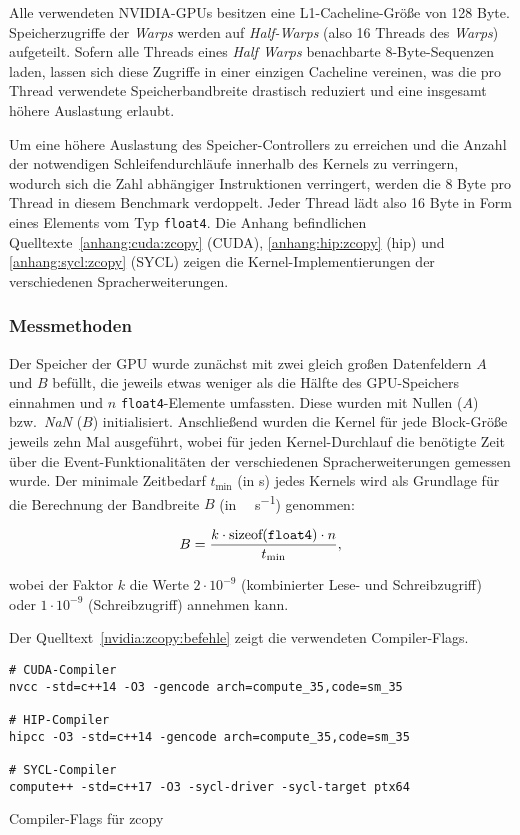 Alle verwendeten NVIDIA-GPUs besitzen eine L1-Cacheline-Größe von \num{128}
Byte. Speicherzugriffe der \textit{Warps} werden auf \textit{Half-Warps} (also
\num{16} Threads des \textit{Warps}) aufgeteilt. Sofern alle Threads eines
\textit{Half Warps} benachbarte \num{8}-Byte-Sequenzen laden, lassen sich diese
Zugriffe in einer einzigen Cacheline vereinen, was die pro Thread verwendete
Speicherbandbreite drastisch reduziert und eine insgesamt höhere Auslastung
erlaubt.

Um eine höhere Auslastung des Speicher-Controllers zu erreichen und die Anzahl
der notwendigen Schleifendurchläufe innerhalb des Kernels zu verringern, wodurch
sich die Zahl abhängiger Instruktionen verringert, werden die \num{8} Byte pro
Thread in diesem Benchmark verdoppelt. Jeder Thread lädt also \num{16} Byte in
Form eines Elements vom Typ \texttt{float4}. Die Anhang befindlichen
Quelltexte~\ref{anhang:cuda:zcopy} (CUDA), \ref{anhang:hip:zcopy} (\gls{hip})
und \ref{anhang:sycl:zcopy} (SYCL) zeigen die Kernel-Implementierungen der
verschiedenen Spracherweiterungen.

\subsubsection{Messmethoden}
\label{nvidia:zcopy:methoden}

Der Speicher der GPU wurde zunächst mit zwei gleich großen Datenfeldern $A$ und
$B$ befüllt, die jeweils etwas weniger als die Hälfte des GPU-Speichers
einnahmen und $n$ \texttt{float4}-Elemente umfassten. Diese wurden mit Nullen
($A$) bzw.\ \textit{NaN} ($B$) initialisiert. Anschließend wurden die Kernel für
jede Block-Größe jeweils zehn Mal ausgeführt, wobei für jeden Kernel-Durchlauf
die benötigte Zeit über die Event-Funktionalitäten der verschiedenen
Spracherweiterungen gemessen wurde. Der minimale Zeitbedarf $t_{\text{min}}$
(in \si{\second}) jedes Kernels wird als Grundlage für die Berechnung der
Bandbreite $B$ (in \si{\gibi\byte\per\second}) genommen:

\[
    B = \frac{k \cdot \text{sizeof(\texttt{float4})} \cdot n}{t_\text{min}},
\]

wobei der Faktor $k$ die Werte $2 \cdot 10^{-9}$ (kombinierter Lese- und
Schreibzugriff) oder $1 \cdot 10^{-9}$ (Schreibzugriff) annehmen kann.

Der Quelltext~\ref{nvidia:zcopy:befehle} zeigt die verwendeten Compiler-Flags.

\begin{code}
    \begin{verbatim}
# CUDA-Compiler
nvcc -std=c++14 -O3 -gencode arch=compute_35,code=sm_35

# HIP-Compiler
hipcc -O3 -std=c++14 -gencode arch=compute_35,code=sm_35

# SYCL-Compiler
compute++ -std=c++17 -O3 -sycl-driver -sycl-target ptx64
    \end{verbatim}
    \caption{Compiler-Flags für zcopy}
    \label{nvidia:zcopy:befehle}
\end{code}

